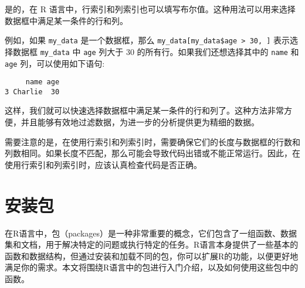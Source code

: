 \documentclass[
  letterpaper,
  DIV=11,
  numbers=noendperiod]{scrreprt}
\newenvironment{Shaded}{\begin{snugshade}}{\end{snugshade}}
\newcommand{\AttributeTok}[1]{\textcolor[rgb]{0.40,0.45,0.13}{#1}}
\newcommand{\DecValTok}[1]{\textcolor[rgb]{0.68,0.00,0.00}{#1}}
\newcommand{\FunctionTok}[1]{\textcolor[rgb]{0.28,0.35,0.67}{#1}}
\newcommand{\NormalTok}[1]{\textcolor[rgb]{0.00,0.23,0.31}{#1}}
\newcommand{\OtherTok}[1]{\textcolor[rgb]{0.00,0.23,0.31}{#1}}
\newcommand{\SpecialCharTok}[1]{\textcolor[rgb]{0.37,0.37,0.37}{#1}}
\newcommand{\StringTok}[1]{\textcolor[rgb]{0.13,0.47,0.30}{#1}}
\begin{document}
是的，在 R
语言中，行索引和列索引也可以填写布尔值。这种用法可以用来选择数据框中满足某一条件的行和列。

例如，如果 \texttt{my\_data} 是一个数据框，那么
\texttt{my\_data{[}my\_data\$age\ \textgreater{}\ 30,\ {]}}
表示选择数据框 \texttt{my\_data} 中 \texttt{age} 列大于 30
的所有行。如果我们还想选择其中的 \texttt{name} 和 \texttt{age}
列，可以使用如下语句:

\begin{Shaded}
\end{Shaded}

\begin{verbatim}
     name age
3 Charlie  30
\end{verbatim}

这样，我们就可以快速选择数据框中满足某一条件的行和列了。这种方法非常方便，并且能够有效地过滤数据，为进一步的分析提供更为精细的数据。

需要注意的是，在使用行索引和列索引时，需要确保它们的长度与数据框的行数和列数相同。如果长度不匹配，那么可能会导致代码出错或不能正常运行。因此，在使用行索引和列索引时，应该认真检查代码是否正确。

\chapter{安装包}\label{ux5b89ux88c5ux5305}

在R语言中，包（packages）是一种非常重要的概念，它们包含了一组函数、数据集和文档，用于解决特定的问题或执行特定的任务。R语言本身提供了一些基本的函数和数据结构，但通过安装和加载不同的包，你可以扩展R的功能，以便更好地满足你的需求。本文将围绕R语言中的包进行入门介绍，以及如何使用这些包中的函数。
\end{document}
